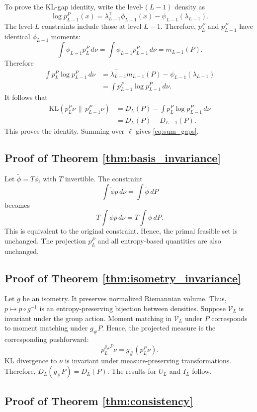 \documentclass[twoside]{article}
\theoremstyle{definition}
\theoremstyle{remark}
\newcommand{\V}{\mathcal V}
\newcommand{\KL}{\mathrm{KL}}
\begin{document}
To prove the KL-gap identity, write the level-$(L-1)$ density as
\[
  \log p_{L-1}^P(x)=\lambda_{L-1}^\top\phi_{L-1}(x)-\psi_{L-1}(\lambda_{L-1}).
\]
The level-$L$ constraints include those at level $L-1$. Therefore, $p_L^P$ and $p_{L-1}^P$ have identical $\phi_{L-1}$ moments:
\[
  \int \phi_{L-1}p_L^P\,d\nu
  =\int \phi_{L-1}p_{L-1}^P\,d\nu
  =m_{L-1}(P).
\]
Therefore
\begin{align*}
  \int p_L^P\log p_{L-1}^P\,d\nu
  &=\lambda_{L-1}^\top m_{L-1}(P)-\psi_{L-1}(\lambda_{L-1})\\
  &=\int p_{L-1}^P\log p_{L-1}^P\,d\nu.
\end{align*}
It follows that
\begin{align*}
 \KL(p_L^P\nu\,\|\,p_{L-1}^P\nu)
 &=D_L(P)-\int p_L^P\log p_{L-1}^P\,d\nu\\
 &=D_L(P)-D_{L-1}(P).
\end{align*}
This proves the identity. Summing over $\ell$ gives \eqref{eq:sum_gaps}.

\subsection{Proof of Theorem \ref{thm:basis_invariance}}

Let $\widetilde\phi=T\phi$, with $T$ invertible. The constraint
\[
  \int \widetilde\phi p\,d\nu=\int \widetilde\phi\,dP
\]
becomes
\[
  T\int \phi p\,d\nu=T\int\phi\,dP.
\]
This is equivalent to the original constraint. Hence, the primal feasible set is unchanged. The projection $p_L^P$ and all entropy-based quantities are also unchanged.

\subsection{Proof of Theorem \ref{thm:isometry_invariance}}

Let $g$ be an isometry. It preserves normalized Riemannian volume. Thus, $p\mapsto p\circ g^{-1}$ is an entropy-preserving bijection between densities. Suppose $\V_L$ is invariant under the group action. Moment matching in $\V_L$ under $P$ corresponds to moment matching under $g_\#P$. Hence, the projected measure is the corresponding pushforward:
\[
  p_L^{g_\#P}\nu=g_\#(p_L^P\nu).
\]
KL divergence to $\nu$ is invariant under measure-preserving transformations. Therefore, $D_L(g_\#P)=D_L(P)$. The results for $U_L$ and $I_L$ follow.

\subsection{Proof of Theorem \ref{thm:consistency}}
\end{document}

